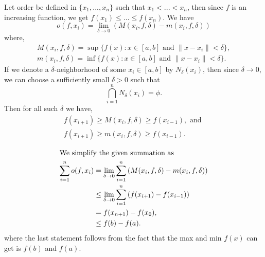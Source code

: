 \begin{questions}

\begin{solution}
    Let order be defined in $\{x_1, . . . ,x_n\}$ such that 
    $x_1<...<x_n$, then since $f$ is an increasing function, 
    we get $f(x_1)\le...\le f(x_n)$. We have
    $$o(f,x_i)=\lim_{\delta\to 0}{(M(x_i,f,\delta)-m(x_i,f,\delta) )}$$
    where,
    $$\begin{array}{cc}
        M(x_i,f,\delta) = \sup {\{f(x):x\in [a,b] \text{ and }
         \|x-x_i\|<\delta}\},\\
        m(x_i,f,\delta) = \inf {\{f(x):x\in [a,b] \text{ and }
         \|x-x_i\|<\delta}\}.
    \end{array}$$
    If we denote a $\delta$-neighborhood of some 
    $x_i\in [a,b]$ by $N_{\delta}(x_i)$, then since $\delta\to 0$, 
    we can choose a sufficiently small $\delta>0$ such that
    $$\bigcap_{i=1}^{n}{N_{\delta}(x_i)}=\phi.$$ Then for all 
    such $\delta$ we have, 
    $$\begin{array}{cc}
        f(x_{i+1})\ge M(x_i,f,\delta)\ge f(x_{i-1}),\text{ and }\\
        f(x_{i+1})\ge m(x_i,f,\delta)\ge f(x_{i-1}).
    \end{array}$$
    
    \begin{align*}
        \shortintertext{We simplify the given summation as}
        \sum_{i=1}^{n}{o(f,x_i)} &= 
            \lim_{\delta\to 0}{\sum_{i=1}^{n}
            {(M(x_i,f,\delta)-m(x_i,f,\delta))}}\\
        & \le \lim_{\delta \to 0}\sum_{i=1}^{n}
            {(f(x_{i+1}) - f(x_{i-1})})\\
        & = f(x_{n+1})-f(x_{0}),\\
        & \le f(b)-f(a).
    \end{align*}
    where the last statement follows from the fact that 
    the max and min $f(x)$ can get is $f(b)$ and $f(a)$.
    \qedsymbol
\end{solution}
\end{questions}